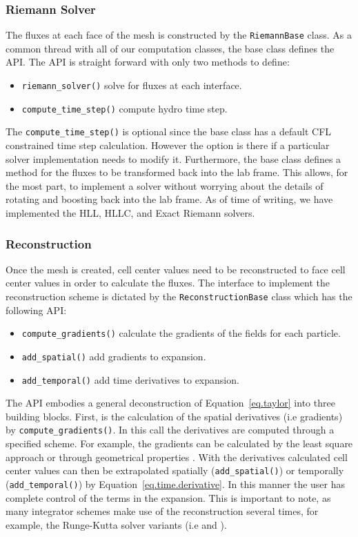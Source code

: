 \subsubsection{Riemann Solver}
The fluxes at each face of the mesh is constructed by the \lstinline{RiemannBase} class.
As a common thread with all of our computation classes, the base class defines the API.
The API is straight forward with only two methods to define:
\begin{itemize}
	\item \lstinline{riemann_solver()} solve for fluxes at each interface.
    \item \lstinline{compute_time_step()} compute hydro time step.
\end{itemize}
The \lstinline{compute_time_step()} is optional since the base class has a default
CFL constrained time step calculation. However the option is there if a particular 
solver implementation needs to modify it. Furthermore, the base class defines a 
method for the fluxes to be transformed back into the lab frame. This allows,
for the most part, to implement a solver without worrying about the details of
rotating and boosting back into the lab frame. As of time of writing, we have
implemented the HLL, HLLC, and Exact Riemann solvers.

\subsubsection{Reconstruction}
Once the mesh is created, cell center values need to be reconstructed to face cell center values
in order to calculate the fluxes. The interface to implement the reconstruction
scheme is dictated by the \lstinline{ReconstructionBase} class which has the following API:
\begin{itemize}
	\item \lstinline{compute_gradients()} calculate the gradients of the fields for each particle.
    \item \lstinline{add_spatial()} add gradients to expansion.
    \item \lstinline{add_temporal()} add time derivatives to expansion.
\end{itemize}
The API embodies a general deconstruction of Equation~\ref{eq.taylor} into three building blocks.
First, is the calculation of the spatial derivatives (i.e gradients) by \lstinline{compute_gradients()}.
In this call the derivatives are computed through a specified scheme. For example, the gradients can be 
calculated by the least square approach \citep{Pakmor2016} or through geometrical properties 
\citep{Springel2010}. With the derivatives calculated cell center values can then be extrapolated spatially
(\lstinline{add_spatial()}) or temporally (\lstinline{add_temporal()}) by Equation~\ref{eq.time.derivative}.
In this manner the user has complete control of the terms in the expansion. This is important to note,
as many integrator schemes make use of the reconstruction several times, for example, the Runge-Kutta solver 
variants (i.e \cite{Pakmor2016} and \cite{Duffell2011}).

